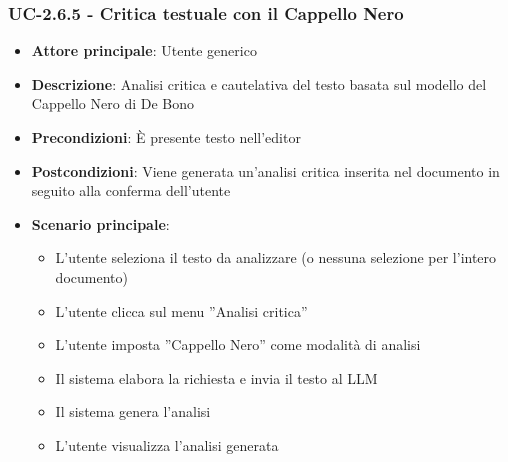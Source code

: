 \documentclass[11pt,a4paper]{article}
\begin{document}
\subsubsection{UC-2.6.5 - Critica testuale con il Cappello Nero}
\begin{itemize}
    \item \textbf{Attore principale}: Utente generico
    \item \textbf{Descrizione}: Analisi critica e cautelativa del testo basata sul modello del Cappello Nero di De Bono
    \item \textbf{Precondizioni}: È presente testo nell’editor
    \item \textbf{Postcondizioni}: Viene generata un’analisi critica inserita nel documento in seguito alla conferma dell'utente
    \item \textbf{Scenario principale}:
    \begin{itemize}
        \item L’utente seleziona il testo da analizzare (o nessuna selezione per l'intero documento)
        \item L’utente clicca sul menu ”Analisi critica”
        \item L’utente imposta ”Cappello Nero” come modalità di analisi
        \item Il sistema elabora la richiesta e invia il testo al LLM
        \item Il sistema genera l'analisi 
        \item L'utente visualizza l'analisi generata
    \end{itemize}
\end{itemize}
\end{document}
